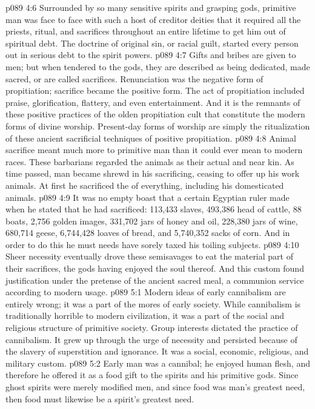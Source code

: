 \vs p089 4:6 Surrounded by so many sensitive spirits and grasping gods, primitive man was face to face with such a host of creditor deities that it required all the priests, ritual, and sacrifices throughout an entire lifetime to get him out of spiritual debt. The doctrine of original sin, or racial guilt, started every person out in serious debt to the spirit powers.
\pc \vs p089 4:7 Gifts and bribes are given to men; but when tendered to the gods, they are described as being dedicated, made sacred, or are called sacrifices. Renunciation was the negative form of propitiation; sacrifice became the positive form. The act of propitiation included praise, glorification, flattery, and even entertainment. And it is the remnants of these positive practices of the olden propitiation cult that constitute the modern forms of divine worship. Present\hyp{}day forms of worship are simply the ritualization of these ancient sacrificial techniques of positive propitiation.
\pc \vs p089 4:8 Animal sacrifice meant much more to primitive man than it could ever mean to modern races. These barbarians regarded the animals as their actual and near kin. As time passed, man became shrewd in his sacrificing, ceasing to offer up his work animals. At first he sacrificed the  of everything, including his domesticated animals.
\vs p089 4:9 It was no empty boast that a certain Egyptian ruler made when he stated that he had sacrificed: 113,433 slaves, 493,386 head of cattle, 88 boats, 2,756 golden images, 331,702 jars of honey and oil, 228,380 jars of wine, 680,714 geese, 6,744,428 loaves of bread, and 5,740,352 sacks of corn. And in order to do this he must needs have sorely taxed his toiling subjects.
\vs p089 4:10 Sheer necessity eventually drove these semisavages to eat the material part of their sacrifices, the gods having enjoyed the soul thereof. And this custom found justification under the pretense of the ancient sacred meal, a communion service according to modern usage.
\vs p089 5:1 Modern ideas of early cannibalism are entirely wrong; it was a part of the mores of early society. While cannibalism is traditionally horrible to modern civilization, it was a part of the social and religious structure of primitive society. Group interests dictated the practice of cannibalism. It grew up through the urge of necessity and persisted because of the slavery of superstition and ignorance. It was a social, economic, religious, and military custom.
\vs p089 5:2 Early man was a cannibal; he enjoyed human flesh, and therefore he offered it as a food gift to the spirits and his primitive gods. Since ghost spirits were merely modified men, and since food was man’s greatest need, then food must likewise be a spirit’s greatest need.
